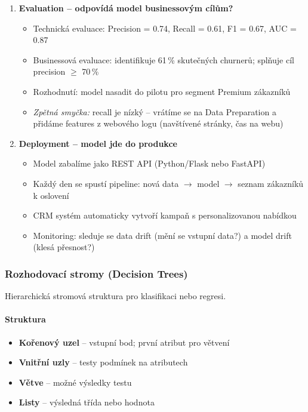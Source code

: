 \begin{enumerate}
  \item \textbf{Evaluation -- odpovídá model businessovým cílům?}
    \begin{itemize}
      \item Technická evaluace: Precision = 0.74, Recall = 0.61, F1 = 0.67, AUC = 0.87
      \item Businessová evaluace: identifikuje 61\,\% skutečných churnerů;
        splňuje cíl precision $\geq$ 70\,\%
      \item Rozhodnutí: model nasadit do pilotu pro segment Premium zákazníků
      \item \textit{Zpětná smyčka:} recall je nízký -- vrátíme se na Data Preparation a přidáme features
        z webového logu (navštívené stránky, čas na webu)
    \end{itemize}

  \item \textbf{Deployment -- model jde do produkce}
    \begin{itemize}
      \item Model zabalíme jako REST API (Python/Flask nebo FastAPI)
      \item Každý den se spustí pipeline: nová data $\to$ model $\to$ seznam zákazníků k oslovení
      \item CRM systém automaticky vytvoří kampaň s personalizovanou nabídkou
      \item Monitoring: sleduje se data drift (mění se vstupní data?) a model drift (klesá přesnost?)
    \end{itemize}
\end{enumerate}

\subsubsection{Rozhodovací stromy (Decision Trees)}

Hierarchická stromová struktura pro klasifikaci nebo regresi.

\paragraph{Struktura}
\begin{itemize}
  \item \textbf{Kořenový uzel} -- vstupní bod; první atribut pro větvení
  \item \textbf{Vnitřní uzly} -- testy podmínek na atributech
  \item \textbf{Větve} -- možné výsledky testu
  \item \textbf{Listy} -- výsledná třída nebo hodnota
\end{itemize}

